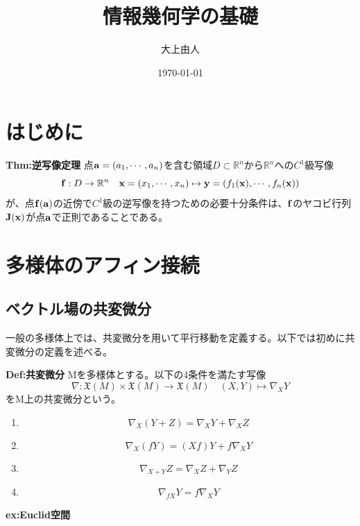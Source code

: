 \documentclass[a4paper,11pt]{jsarticle}
\numberwithin{equation}{section}
\begin{document}
\title{情報幾何学の基礎}
\author{大上由人}
\date{\today}
\maketitle

\tableofcontents
\newpage

\section{はじめに}
\begin{itembox}[l]{\textbf{Thm:逆写像定理}}
点$\vb{a}=(a_1,\cdots,a_n)$を含む領域$D \subset \mathbb{R}^n$から$\mathbb{R}^n$への$C^1$級写像
\begin{equation}
    \vb{f} : D \to \mathbb{R}^n \quad \vb{x} =(x_1,\cdots,x_n) \mapsto \vb{y} =(f_1(\vb{x}),\cdots,f_n(\vb{x}))
\end{equation}
が、点$\vb{f(a)}$の近傍で$C^1$級の逆写像を持つための必要十分条件は、$\vb{f}$のヤコビ行列$\vb{J}(\vb{x})$が点$\vb{a}$で正則であることである。

\end{itembox}
\section{多様体のアフィン接続}
\subsection{ベクトル場の共変微分}
一般の多様体上では、共変微分を用いて平行移動を定義する。以下では初めに共変微分の定義を述べる。

\begin{itembox}[l]{\textbf{Def:共変微分}}
    Mを多様体とする。以下の4条件を満たす写像
    \begin{equation}
        \nabla : \mathfrak{X}(M) \times \mathfrak{X}(M) \to \mathfrak{X}(M) \quad (X,Y) \mapsto \nabla_XY
    \end{equation}
    をM上の共変微分という。
    \begin{enumerate}
        \item 
        \begin{equation}
            \nabla_X(Y+Z) = \nabla_XY + \nabla_XZ
        \end{equation}

        \item
        \begin{equation}
            \nabla_X(fY) = (Xf)Y + f\nabla_XY
        \end{equation}

        \item
        \begin{equation}
            \nabla_{X+Y}Z = \nabla_XZ + \nabla_YZ
        \end{equation}

        \item
        \begin{equation}
            \nabla_{fX}Y = f\nabla_XY
        \end{equation}
    \end{enumerate}
\end{itembox}
\textbf{ex:Euclid空間}\\
\end{document}
